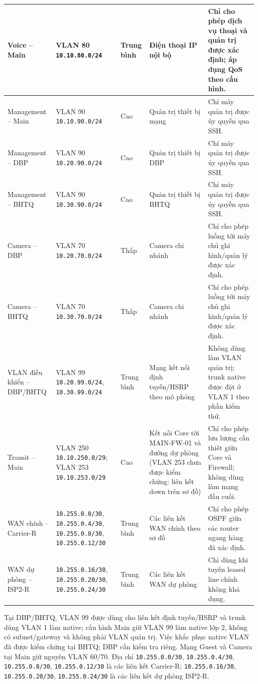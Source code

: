\begin{small}
\begin{longtable}{|p{2.2cm}|p{3.8cm}|p{1.5cm}|p{3.4cm}|p{3.3cm}|}
Voice -- Main & VLAN 80 \texttt{10.10.80.0/24} & Trung bình & Điện thoại IP nội bộ & Chỉ cho phép dịch vụ thoại và quản trị được xác định; áp dụng QoS theo cấu hình. \\ \hline
Management -- Main & VLAN 90 \texttt{10.10.90.0/24} & Cao & Quản trị thiết bị mạng & Chỉ máy quản trị được ủy quyền qua SSH. \\ \hline
Management -- DBP & VLAN 90 \texttt{10.20.90.0/24} & Cao & Quản trị thiết bị DBP & Chỉ máy quản trị được ủy quyền qua SSH. \\ \hline
Management -- BHTQ & VLAN 90 \texttt{10.30.90.0/24} & Cao & Quản trị thiết bị BHTQ & Chỉ máy quản trị được ủy quyền qua SSH. \\ \hline
Camera -- DBP & VLAN 70 \texttt{10.20.70.0/24} & Thấp & Camera chi nhánh & Chỉ cho phép luồng tới máy chủ ghi hình/quản lý được xác định. \\ \hline
Camera -- BHTQ & VLAN 70 \texttt{10.30.70.0/24} & Thấp & Camera chi nhánh & Chỉ cho phép luồng tới máy chủ ghi hình/quản lý được xác định. \\ \hline
VLAN điều khiển -- DBP/BHTQ & VLAN 99 \texttt{10.20.99.0/24}, \texttt{10.30.99.0/24} & Trung bình & Mạng kết nối định tuyến/HSRP theo mô phỏng & Không dùng làm VLAN quản trị; trunk native được đặt ở VLAN 1 theo phần kiểm thử. \\ \hline
Transit -- Main & VLAN 250 \texttt{10.10.250.0/29}; VLAN 253 \texttt{10.10.253.0/29} & Cao & Kết nối Core tới MAIN-FW-01 và đường dự phòng (VLAN 253 chưa được kiểm chứng: liên kết down trên sơ đồ) & Chỉ cho phép lưu lượng cần thiết giữa Core và Firewall; không dùng làm mạng đầu cuối. \\ \hline
WAN chính -- Carrier-R & \texttt{10.255.0.0/30}, \texttt{10.255.0.4/30}, \texttt{10.255.0.8/30}, \texttt{10.255.0.12/30} & Trung bình & Các liên kết WAN chính theo sơ đồ & Chỉ cho phép OSPF giữa các router ngang hàng đã xác định. \\ \hline
WAN dự phòng -- ISP2-R & \texttt{10.255.0.16/30}, \texttt{10.255.0.20/30}, \texttt{10.255.0.24/30} & Trung bình & Các liên kết WAN dự phòng & Chỉ dùng khi tuyến leased line chính không khả dụng. \\ \hline
\end{longtable}
\end{small}

\noindent Tại DBP/BHTQ, VLAN 99 được dùng cho liên kết định tuyến/HSRP và trunk dùng VLAN 1 làm native; cấu hình Main giữ VLAN 99 làm native lớp 2, không có subnet/gateway và không phải VLAN quản trị. Việc khắc phục native VLAN đã được kiểm chứng tại BHTQ; DBP cần kiểm tra riêng. Mạng Guest và Camera tại Main giữ nguyên VLAN 60/70. Địa chỉ \texttt{10.255.0.0/30}, \texttt{10.255.0.4/30}, \texttt{10.255.0.8/30}, \texttt{10.255.0.12/30} là các liên kết Carrier-R; \texttt{10.255.0.16/30}, \texttt{10.255.0.20/30}, \texttt{10.255.0.24/30} là các liên kết dự phòng ISP2-R.

